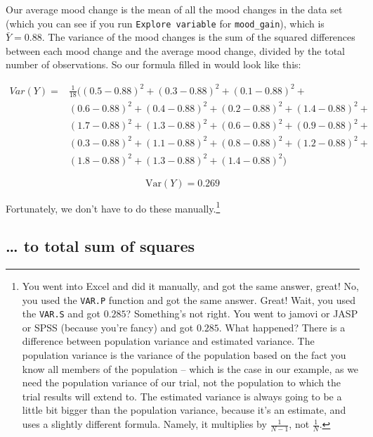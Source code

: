 \documentclass[
  11pt,
  a4paper,
  twoside,symmetric,openright]{book}
\theoremstyle{break}
\theoremstyle{break}
\begin{document}
Our average mood change is the mean of all the mood changes in the data set (which you can see if you run \texttt{Explore\ variable} for \texttt{mood\_gain}), which is \(\bar{Y} = 0.88\). The variance of the mood changes is the sum of the squared differences between each mood change and the average mood change, divided by the total number of observations. So our formula filled in would look like this:

\[
\begin{array}{ll}
{Var}(Y) =& \frac{1}{18} ( (0.5 - 0.88 )^2 + (0.3 -0.88 )^2 + (0.1 - 0.88 )^2 + \\
 & (0.6 - 0.88 )^2 + (0.4 - 0.88 )^2 + (0.2 - 0.88 )^2 + (1.4 - 0.88 )^2 + \\
 & (1.7 - 0.88 )^2 + (1.3 - 0.88 )^2 + (0.6 - 0.88 )^2 + (0.9 - 0.88 )^2 + \\
 & (0.3 - 0.88 )^2 + (1.1 - 0.88 )^2 + (0.8 - 0.88 )^2 + (1.2 - 0.88 )^2 + \\
 & (1.8 - 0.88 )^2 + (1.3 - 0.88 )^2 + (1.4 - 0.88 )^2 )
\end{array}
\]

\[
\mbox{Var}(Y) = 0.269
\]

Fortunately, we don't have to do these manually.\footnote{You went into Excel and did it manually, and got the same answer, great! No, you used the \texttt{VAR.P} function and got the same answer. Great! Wait, you used the \texttt{VAR.S} and got \(0.285\)? Something's not right. You went to jamovi or JASP or SPSS (because you're fancy) and got \(0.285\). What happened? There is a difference between population variance and estimated variance. The population variance is the variance of the population based on the fact you know all members of the population -- which is the case in our example, as we need the population variance of our trial, not the population to which the trial results will extend to. The estimated variance is always going to be a little bit bigger than the population variance, because it's an estimate, and uses a slightly different formula. Namely, it multiplies by \(\frac{1}{N-1}\), not \(\frac{1}{N}\).}

\subsection{\ldots{} to total sum of squares}\label{to-total-sum-of-squares}
\end{document}
